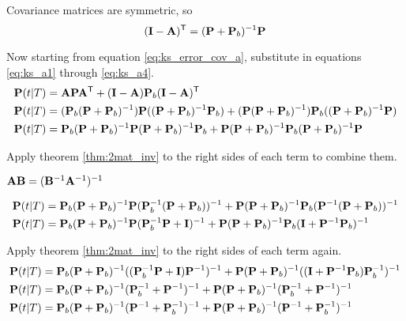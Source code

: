 Covariance matrices are symmetric, so
\begin{equation}
  (\mathbf{I} - \mathbf{A})^\mathsf{T} = (\mathbf{P} + \mathbf{P}_b)^{-1}\mathbf{P} \label{eq:ks_a4}
\end{equation}

Now starting from equation \eqref{eq:ks_error_cov_a}, substitute in equations
\eqref{eq:ks_a1} through \eqref{eq:ks_a4}.
\begin{align*}
  \mathbf{P}(t|T) &=
    \mathbf{A}\mathbf{P}\mathbf{A}^\mathsf{T} + (\mathbf{I} - \mathbf{A})\mathbf{P}_b(\mathbf{I} - \mathbf{A})^\mathsf{T}
    \\
  \mathbf{P}(t|T) &=
    (\mathbf{P}_b(\mathbf{P} + \mathbf{P}_b)^{-1})\mathbf{P}
      ((\mathbf{P} + \mathbf{P}_b)^{-1}\mathbf{P}_b) +
    (\mathbf{P}(\mathbf{P} + \mathbf{P}_b)^{-1})\mathbf{P}_b
      ((\mathbf{P} + \mathbf{P}_b)^{-1}\mathbf{P}) \\
  \mathbf{P}(t|T) &=
    \mathbf{P}_b(\mathbf{P} + \mathbf{P}_b)^{-1}\mathbf{P}
    (\mathbf{P} + \mathbf{P}_b)^{-1}\mathbf{P}_b + \mathbf{P}
      (\mathbf{P} + \mathbf{P}_b)^{-1}\mathbf{P}_b
      (\mathbf{P} + \mathbf{P}_b)^{-1}\mathbf{P}
\end{align*}

Apply theorem \ref{thm:2mat_inv} to the right sides of each term to combine
them.
\begin{theorem}
  \label{thm:2mat_inv}

  $\mathbf{A}\mathbf{B} = (\mathbf{B}^{-1}\mathbf{A}^{-1})^{-1}$
\end{theorem}
\begin{align*}
  \mathbf{P}(t|T) &=
    \mathbf{P}_b(\mathbf{P} + \mathbf{P}_b)^{-1}\mathbf{P}
      (\mathbf{P}_b^{-1}(\mathbf{P} + \mathbf{P}_b))^{-1} +
    \mathbf{P}(\mathbf{P} + \mathbf{P}_b)^{-1}\mathbf{P}_b
      (\mathbf{P}^{-1}(\mathbf{P} + \mathbf{P}_b))^{-1} \\
  \mathbf{P}(t|T) &= \mathbf{P}_b(\mathbf{P} + \mathbf{P}_b)^{-1}\mathbf{P}
      (\mathbf{P}_b^{-1}\mathbf{P} + \mathbf{I})^{-1} +
    \mathbf{P}(\mathbf{P} + \mathbf{P}_b)^{-1}\mathbf{P}_b
      (\mathbf{I} + \mathbf{P}^{-1}\mathbf{P}_b)^{-1}
\end{align*}

Apply theorem \ref{thm:2mat_inv} to the right sides of each term again.
\begin{align*}
  \mathbf{P}(t|T) &=
    \mathbf{P}_b(\mathbf{P} + \mathbf{P}_b)^{-1}
      ((\mathbf{P}_b^{-1}\mathbf{P} + \mathbf{I})\mathbf{P}^{-1})^{-1} +
    \mathbf{P}(\mathbf{P} + \mathbf{P}_b)^{-1}
      ((\mathbf{I} + \mathbf{P}^{-1}\mathbf{P}_b)\mathbf{P}_b^{-1})^{-1} \\
  \mathbf{P}(t|T) &=
    \mathbf{P}_b(\mathbf{P} + \mathbf{P}_b)^{-1}(\mathbf{P}_b^{-1} + \mathbf{P}^{-1})^{-1} +
    \mathbf{P}(\mathbf{P} + \mathbf{P}_b)^{-1}(\mathbf{P}_b^{-1} + \mathbf{P}^{-1})^{-1} \\
  \mathbf{P}(t|T) &= \mathbf{P}_b(\mathbf{P} + \mathbf{P}_b)^{-1}
    (\mathbf{P}^{-1} + \mathbf{P}_b^{-1})^{-1} +
    \mathbf{P}(\mathbf{P} + \mathbf{P}_b)^{-1}(\mathbf{P}^{-1} + \mathbf{P}_b^{-1})^{-1}
\end{align*}


